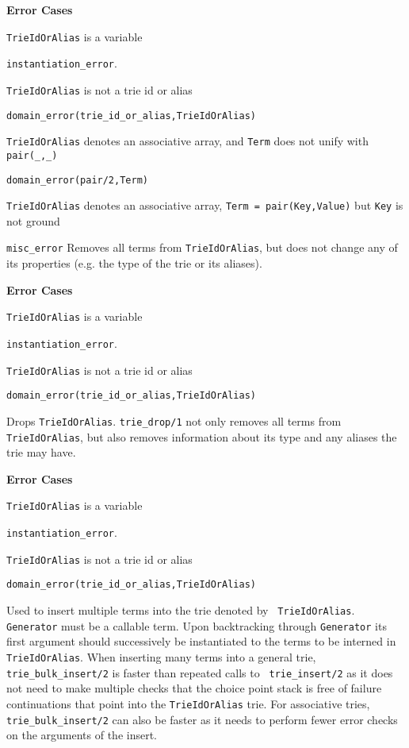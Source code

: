 \begin{description}
{\bf Error Cases}
\bi
\item 	{\tt TrieIdOrAlias} is a variable
\bi
\item 	{\tt instantiation\_error}.
\ei
\item 	{\tt TrieIdOrAlias} is not a trie id or alias
\bi
\item 	{\tt domain\_error(trie\_id\_or\_alias,TrieIdOrAlias)}
\ei
\item 	{\tt TrieIdOrAlias} denotes an associative array, and {\tt Term} 
  does not unify with {\tt pair(\_,\_)} 
\bi
\item 	{\tt domain\_error(pair/2,Term)}
\ei
\item {\tt TrieIdOrAlias} denotes an associative array, 
  {\tt Term = pair(Key,Value)} but {\tt Key} is not ground 
\bi
\item 	{\tt misc\_error}
\ei
\ei
%
%
Removes all terms from {\tt TrieIdOrAlias}, but does not change any of
its properties (e.g. the type of the trie or its aliases).  

{\bf Error Cases}
\bi
\item 	{\tt TrieIdOrAlias} is a variable
\bi
\item 	{\tt instantiation\_error}.
\ei
\item 	{\tt TrieIdOrAlias} is not a trie id or alias
\bi
\item 	{\tt domain\_error(trie\_id\_or\_alias,TrieIdOrAlias)}
\ei
\ei

%
Drops {\tt TrieIdOrAlias}.  {\tt trie\_drop/1} not only removes all
terms from {\tt TrieIdOrAlias}, but also removes information about its
type and any aliases the trie may have.

{\bf Error Cases}
\bi
\item 	{\tt TrieIdOrAlias} is a variable
\bi
\item 	{\tt instantiation\_error}.
\ei
\item 	{\tt TrieIdOrAlias} is not a trie id or alias
\bi
\item 	{\tt domain\_error(trie\_id\_or\_alias,TrieIdOrAlias)}
\ei
\ei

% 
Used to insert multiple terms into the trie denoted by {\tt
  TrieIdOrAlias}.  {\tt Generator} must be a callable term.  Upon
backtracking through {\tt Generator} its first argument should
successively be instantiated to the terms to be interned in {\tt
  TrieIdOrAlias}.  When inserting many terms into a general trie, {\tt
  trie\_bulk\_insert/2} is faster than repeated calls to {\tt
  trie\_insert/2} as it does not need to make multiple checks that the
choice point stack is free of failure continuations that point into
the {\tt TrieIdOrAlias} trie.  For associative tries, {\tt
  trie\_bulk\_insert/2} can also be faster as it needs to perform
fewer error checks on the arguments of the insert.


\end{description}
